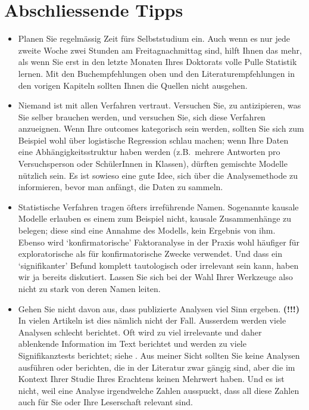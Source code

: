 \documentclass[oneside, 10pt]{book}\usepackage[]{graphicx}\usepackage[]{xcolor}
\begin{document}
\section{Abschliessende Tipps}
\begin{itemize}
  \item Planen Sie regelmässig Zeit fürs Selbststudium ein.
  Auch wenn es nur jede zweite Woche zwei Stunden
  am Freitagnachmittag sind, hilft Ihnen das mehr, als wenn
  Sie erst in den letzte Monaten Ihres Doktorats volle Pulle
  Statistik lernen. Mit den Buchempfehlungen oben und den Literaturempfehlungen
  in den vorigen Kapiteln sollten Ihnen die Quellen nicht ausgehen.

  \item Niemand ist mit allen
  Verfahren vertraut. 
  Versuchen Sie, zu antizipieren, was Sie
  selber brauchen werden, und versuchen Sie, sich diese
  Verfahren anzueignen. Wenn Ihre outcomes kategorisch
  sein werden, sollten Sie sich zum Beispiel wohl über
  logistische Regression schlau machen; wenn Ihre Daten eine
  Abhängigkeitsstruktur
  haben werden (z.B.\ mehrere Antworten pro Versuchsperson
  oder SchülerInnen in Klassen), dürften gemischte Modelle
  nützlich sein.
  Es ist sowieso eine gute Idee,
  sich über die Analysemethode zu informieren, bevor man anfängt,
  die Daten zu sammeln.

  \item Statistische Verfahren tragen öfters irreführende Namen.
  Sogenannte kausale Modelle erlauben es einem zum Beispiel nicht,
  kausale Zusammenhänge zu belegen; diese sind eine Annahme des Modells,
  kein Ergebnis von ihm. Ebenso wird `konfirmatorische' Faktoranalyse in der Praxis
  wohl häufiger für exploratorische als für konfirmatorische Zwecke
  verwendet. Und dass ein `signifikanter' Befund komplett tautologisch
  oder irrelevant sein kann, haben wir ja bereits diskutiert.
  Lassen Sie sich bei der Wahl Ihrer Werkzeuge also nicht zu stark
  von deren Namen leiten.

  \item Gehen Sie nicht davon aus, dass publizierte Analysen
  viel Sinn ergeben. \textbf{(!!!)}
  In vielen Artikeln ist dies nämlich nicht der
  Fall. Ausserdem werden viele Analysen schlecht berichtet.
  Oft wird zu viel irrelevante und daher ablenkende Information
  im Text berichtet und werden zu viele Signifikanztests berichtet;
  siehe \citet{Vanhove2020b}.
  Aus meiner Sicht sollten Sie keine Analysen ausführen oder berichten,
  die in der Literatur zwar gängig sind, aber die im Kontext Ihrer Studie
  Ihres Erachtens keinen Mehrwert haben. Und es ist nicht, weil eine
  Analyse irgendwelche Zahlen ausspuckt, dass all diese Zahlen auch für
  Sie oder Ihre Leserschaft relevant sind.


\end{itemize}
\end{document}
